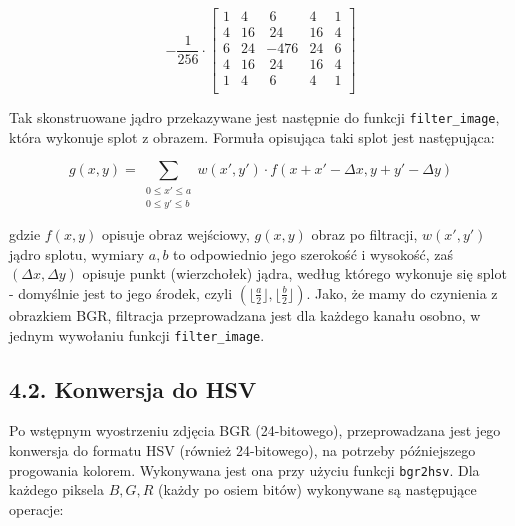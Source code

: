 \documentclass[11pt,a4paper,twoside]{report}
\begin{document}
			\[
				-\frac{1}{256} \cdot
				\begin{bmatrix}
					1 &  4 &   ~6 &  4 & 1 \\
					4 & 16 &  ~24 & 16 & 4 \\
					6 & 24 & -476 & 24 & 6 \\
					4 & 16 &  ~24 & 16 & 4 \\
					1 &  4 &   ~6 &  4 & 1 \\
				\end{bmatrix}
			\]

			Tak skonstruowane jądro przekazywane jest następnie do funkcji \texttt{filter\_image}, która wykonuje splot z obrazem. Formuła opisująca taki splot jest następująca:

			\[
				g(x, y) = \sum_{\substack{0 \leq x' \leq a \\ 0 \leq y' \leq b}} w(x', y') \cdot f(x + x' - \Delta x, y + y' - \Delta y)
			\]

			gdzie $f(x, y)$ opisuje obraz wejściowy, $g(x, y)$ obraz po filtracji, $w(x', y')$ jądro splotu, wymiary $a, b$ to odpowiednio jego szerokość i wysokość, zaś $(\Delta x, \Delta y)$ opisuje punkt (wierzchołek) jądra, według którego wykonuje się splot - domyślnie jest to jego środek, czyli $(\lfloor \frac{a}{2} \rfloor, \lfloor \frac{b}{2} \rfloor)$. Jako, że mamy do czynienia z obrazkiem BGR, filtracja przeprowadzana jest dla każdego kanału osobno, w jednym wywołaniu funkcji \texttt{filter\_image}.

	\subsection*{4.2. Konwersja do HSV}

			Po wstępnym wyostrzeniu zdjęcia BGR (24-bitowego), przeprowadzana jest jego konwersja do formatu HSV (również 24-bitowego), na potrzeby późniejszego progowania kolorem. Wykonywana jest ona przy użyciu funkcji \texttt{bgr2hsv}. Dla każdego piksela $B, G, R$ (każdy po osiem bitów) wykonywane są następujące operacje:
\end{document}
